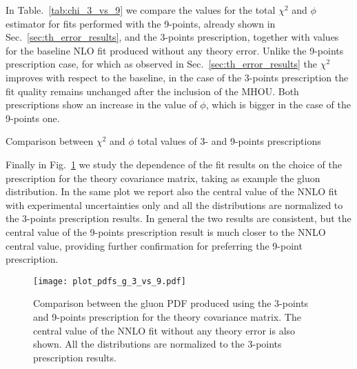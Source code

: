 %
In Table.~\ref{tab:chi_3_vs_9} we compare the values for the total $\chi^2$ and $\phi$ estimator for fits performed with the 9-points,
already shown in Sec.~\ref{sec:th_error_results}, and the 3-points
prescription, together with values for the baseline NLO fit produced without any theory error.
Unlike the 9-points prescription case, for which as observed in Sec.~\ref{sec:th_error_results}
the $\chi^2$ improves with respect to the baseline,
in the case of the 3-points prescription the fit quality remains unchanged after the inclusion of the MHOU.
Both prescriptions show an increase in the value of $\phi$, which is bigger in the case of the 9-points one.

\begin{table}[ht!]
	\centering
	\small
	
        \vspace{3mm}
	\caption{Comparison between $\chi^2$ and $\phi$ total values of 3- and 9-points prescriptions}
	\label{tab:chi_3_vs_9}
\end{table}

%
Finally in Fig.~\ref{fig:pdfs_plots_th_err_3_vs_9} we study the dependence of the fit results on the choice of the prescription
for the theory covariance matrix, taking as example the gluon distribution. In the same plot we report also the central value of
the NNLO fit with experimental uncertainties only and all the distributions are normalized to the 3-points prescription results.
In general the two results are consistent, but the central value of the 9-points prescription result is much closer 
to the NNLO central value, providing further confirmation for preferring the 9-point prescription.

\begin{figure}[t!]
    \begin{center}
        \texttt{[image: plot\_pdfs\_g\_3\_vs\_9.pdf]}
        \caption{Comparison between the gluon PDF produced using the 3-points and 9-points prescription
        for the theory covariance matrix. The central value of the NNLO fit without any theory error is also shown.
        All the distributions are normalized to the 3-points prescription results.} 
        \label{fig:pdfs_plots_th_err_3_vs_9} 
    \end{center}
\end{figure}